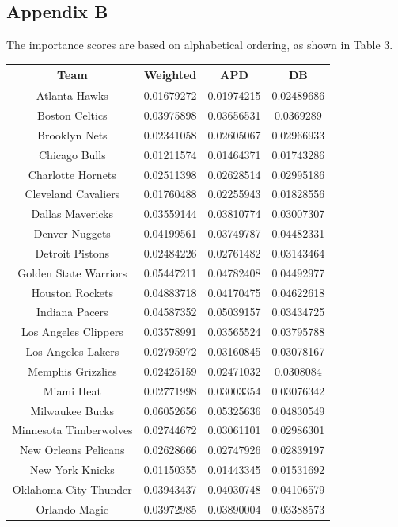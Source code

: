 \documentclass[12pt]{article}%
\begin{document}
\subsection{Appendix B}
The importance scores are based on alphabetical ordering, as shown in Table 3.
\begin{center}
\begin{tabular}{|c|c|c|c|}
\hline
\textbf{Team} &\textbf{Weighted}&\textbf{APD} &\textbf{DB}\\\hline
Atlanta Hawks & 0.01679272 & 0.01974215 & 0.02489686\\
Boston Celtics & 0.03975898 &0.03656531 &0.0369289 \\
Brooklyn Nets & 0.02341058 &0.02605067 &0.02966933\\
Chicago Bulls& 0.01211574 &0.01464371 &0.01743286\\
Charlotte Hornets &0.02511398 &0.02628514 &0.02995186\\
Cleveland Cavaliers&0.01760488 &0.02255943 &0.01828556\\
Dallas Mavericks&0.03559144 &0.03810774 & 0.03007307\\
Denver Nuggets&0.04199561 &0.03749787 &0.04482331\\
Detroit Pistons &0.02484226 &0.02761482 &0.03143464\\
Golden State Warriors&0.05447211 &0.04782408 &0.04492977\\
Houston Rockets&0.04883718 &0.04170475 &0.04622618\\
Indiana Pacers&0.04587352 &0.05039157 &0.03434725\\
Los Angeles Clippers&0.03578991 &0.03565524 &0.03795788\\
Los Angeles Lakers&0.02795972 &0.03160845 &0.03078167\\
Memphis Grizzlies&0.02425159 &0.02471032 &0.0308084 \\
Miami Heat&0.02771998 &0.03003354 &0.03076342\\
Milwaukee Bucks &0.06052656 &0.05325636 &0.04830549\\
Minnesota Timberwolves&0.02744672 &0.03061101 &0.02986301\\
New Orleans Pelicans&0.02628666 &0.02747926 &0.02839197\\
New York Knicks&0.01150355 &0.01443345 &0.01531692\\
Oklahoma City Thunder&0.03943437 &0.04030748 &0.04106579\\
Orlando Magic&0.03972985 &0.03890004 &0.03388573\\

\end{tabular}
\end{center}
\end{document}
